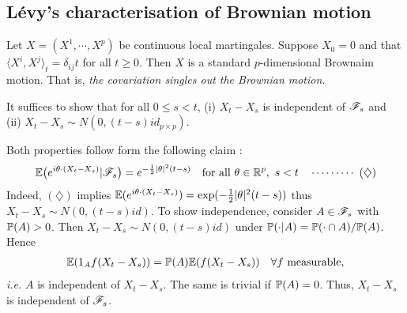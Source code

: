 \documentclass[12pt,a4paper]{article}
\newenvironment{proof}
{\begin{changemargin}{0.5cm}{0.5cm} 
	}%
	{\end{changemargin}
}
\newenvironment{p}
{\begin{proof} 
	}%
	{\end{proof}
}
\begin{document}
\subsection{L\'evy's characterisation of Brownian motion}

\thm Let $X = (X^1, \cdots, X^p)$ be continuous local martingales. Suppose $X_0 = 0$ and that $\langle X^i, X^j \rangle_t = \delta_{ij} t$ for all $t\geq 0$. Then $X$ is a standard $p$-dimensional Brownaim motion. That is, \emph{the covariation singles out the Brownian motion.}
\begin{p}
\pf It suffices to show that for all $0\leq s <t$, (i) $X_t - X_s$ is independent of $\mathscr{F}_s$ and (ii) $X_t - X_s \sim N(0, (t-s)id_{p \times p})$.

\quad Both properties follow form the following claim :
\begin{align*}
\mathbb{E} \big(e^{i\theta \cdot (X_t - X_s)} | \mathscr{F}_s \big) = e^{-\frac{1}{2} |\theta|^2 (t-s)} \quad \text{for all } \theta\in \mathbb{R}^p, \,\, s< t \quad \cdots\cdots\cdots\,\,(\diamondsuit)
\end{align*}
Indeed, $(\diamondsuit)$ implies $\mathbb{E} (e^{i\theta \cdot (X_t - X_s)}) = \exp (- \frac{1}{2} |\theta|^2 (t-s))$ thus $X_t - X_s \sim N(0, (t-s)id)$. To show independence, consider $A\in \mathscr{F}_s$ with $\mathbb{P} (A) > 0$. Then $X_t - X_s \sim N (0, (t-s)id)$ under $\mathbb{P} (\cdot |A) = \mathbb{P}(\cdot \cap A) / \mathbb{P}(A)$. Hence
\begin{align*}
\mathbb{E} (1_A f(X_t - X_s)) = \mathbb{P}(A) \mathbb{E}(f(X_t - X_s))\quad \forall f \text{ measurable},
\end{align*}
\textit{i.e.} $A$ is independent of $X_t - X_s$. The same is trivial if $\mathbb{P}(A) =0$. Thus, $X_t - X_s$ is independent of $\mathscr{F}_s$.
\s


\end{p}
\end{document}
